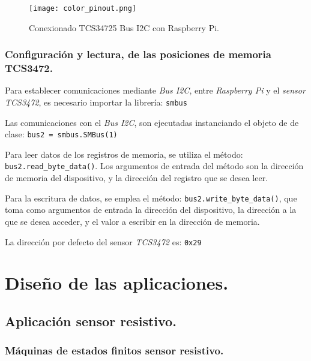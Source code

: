 \begin{figure}[!h]
\begin{center}
\texttt{[image: color\_pinout.png]}
\caption{Conexionado TCS34725 Bus I2C con Raspberry Pi.}
\label{fig:conexioncolor}
\end{center}
\end{figure}



\subsubsection{Configuración y lectura, de las posiciones de memoria TCS3472.}

Para establecer comunicaciones mediante \emph{Bus I2C}, entre \emph{Raspberry Pi} y el \emph{sensor TCS3472}, es necesario importar la librería: \texttt{smbus}

Las comunicaciones con el \emph{Bus I2C}, son ejecutadas instanciando el objeto de de clase: \texttt{bus2 = smbus.SMBus(1)}

Para leer datos de los registros de memoria, se utiliza el método: \texttt{bus2.read\_byte\_data()}. Los argumentos de entrada del método son la dirección de memoria del dispositivo, y la dirección del registro que se desea leer.

Para la escritura de datos, se emplea el método: \texttt{bus2.write\_byte\_data()}, que toma como argumentos de entrada la dirección del dispositivo, la dirección a la que se desea acceder, y el valor a escribir en la dirección de memoria.

La dirección por defecto del sensor \emph{TCS3472} es: \texttt{0x29}













\section{Diseño de las aplicaciones.}

\subsection{Aplicación sensor resistivo.}
\subsubsection{Máquinas de estados finitos sensor resistivo.}


